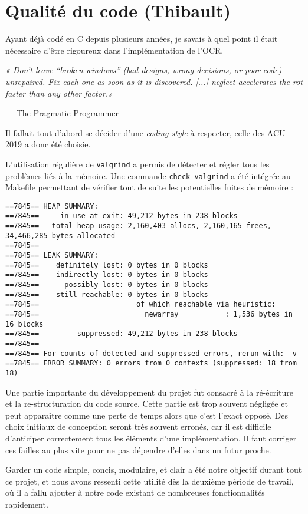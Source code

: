 \chapter{Qualité du code (Thibault)}

Ayant déjà codé en C depuis plusieurs années, je savais à quel point il était
nécessaire d'être rigoureux dans l'implémentation de l'OCR.

\epigraph{\textit{« Don't leave “broken windows” (bad designs, wrong decisions,
or poor code) unrepaired. Fix each one as soon as it is discovered.  [...]
neglect accelerates the rot faster than any other factor.»}}{--- \textup{The
Pragmatic Programmer}}

Il fallait tout d'abord se décider d'une \textit{coding style} à respecter,
celle des ACU 2019 a donc été choisie.

L'utilisation régulière de \texttt{valgrind} a permis de détecter et
régler tous les problèmes liés à la mémoire. Une commande
\texttt{check-valgrind} a été intégrée au Makefile permettant de
vérifier tout de suite les potentielles fuites de mémoire :

\begin{scriptsize}
\begin{verbatim}
==7845== HEAP SUMMARY:
==7845==     in use at exit: 49,212 bytes in 238 blocks
==7845==   total heap usage: 2,160,403 allocs, 2,160,165 frees, 34,466,285 bytes allocated
==7845==
==7845== LEAK SUMMARY:
==7845==    definitely lost: 0 bytes in 0 blocks
==7845==    indirectly lost: 0 bytes in 0 blocks
==7845==      possibly lost: 0 bytes in 0 blocks
==7845==    still reachable: 0 bytes in 0 blocks
==7845==                       of which reachable via heuristic:
==7845==                         newarray           : 1,536 bytes in 16 blocks
==7845==         suppressed: 49,212 bytes in 238 blocks
==7845==
==7845== For counts of detected and suppressed errors, rerun with: -v
==7845== ERROR SUMMARY: 0 errors from 0 contexts (suppressed: 18 from 18)
\end{verbatim}
\end{scriptsize}

\newpage

Une partie importante du développement du projet fut consacré à la ré-écriture
et la re-structuration du code source. Cette partie est trop souvent négligée et
peut apparaître comme une perte de temps alors que c'est l'exact opposé. Des
choix initiaux de conception seront très souvent erronés, car il est difficile
d'anticiper correctement tous les éléments d'une implémentation. Il faut
corriger ces failles au plus vite pour ne pas dépendre d'elles dans un futur
proche.

Garder un code simple, concis, modulaire, et clair a été notre objectif durant
tout ce projet, et nous avons ressenti cette utilité dès la deuxième période de
travail, où il a fallu ajouter à notre code existant de nombreuses
fonctionnalités rapidement.
